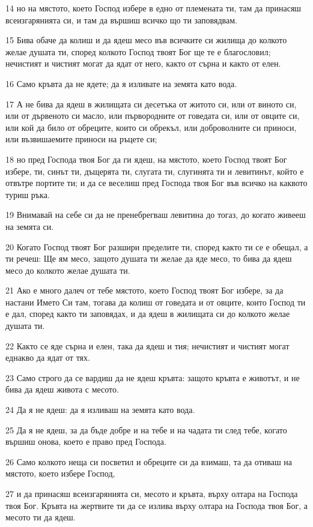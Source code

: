 \par 14 но на мястото, което Господ избере в едно от племената ти, там да принасяш всеизгарянията си, и там да вършиш всичко що ти заповядвам.
\par 15 Бива обаче да колиш и да ядеш месо във всичките си жилища до колкото желае душата ти, според колкото Господ твоят Бог ще те е благословил; нечистият и чистият могат да ядат от него, както от сърна и както от елен.
\par 16 Само кръвта да не ядете; да я изливате на земята като вода.
\par 17 А не бива да ядеш в жилищата си десетъка от житото си, или от виното си, или от дървеното си масло, или първородните от говедата си, или от овците си, или кой да било от обреците, които си обрекъл, или доброволните си приноси, или възвишаемите приноси на ръцете си;
\par 18 но пред Господа твоя Бог да ги ядеш, на мястото, което Господ твоят Бог избере, ти, синът ти, дъщерята ти, слугата ти, слугинята ти и левитинът, който е отвътре портите ти; и да се веселиш пред Господа твоя Бог във всичко на каквото туриш ръка.
\par 19 Внимавай на себе си да не пренебрегваш левитина до тогаз, до когато живееш на земята си.
\par 20 Когато Господ твоят Бог разшири пределите ти, според както ти се е обещал, а ти речеш: Ще ям месо, защото душата ти желае да яде месо, то бива да ядеш месо до колкото желае душата ти.
\par 21 Ако е много далеч от тебе мястото, което Господ твоят Бог избере, за да настани Името Си там, тогава да колиш от говедата и от овците, които Господ ти е дал, според както ти заповядах, и да ядеш в жилищата си до колкото желае душата ти.
\par 22 Както се яде сърна и елен, така да ядеш и тия; нечистият и чистият могат еднакво да ядат от тях.
\par 23 Само строго да се вардиш да не ядеш кръвта: защото кръвта е животът, и не бива да ядеш живота с месото.
\par 24 Да я не ядеш: да я изливаш на земята като вода.
\par 25 Да я не ядеш, за да бъде добре и на тебе и на чадата ти след тебе, когато вършиш онова, което е право пред Господа.
\par 26 Само колкото неща си посветил и обреците си да взимаш, та да отиваш на мястото, което избере Господ,
\par 27 и да принасяш всеизгарянията си, месото и кръвта, върху олтара на Господа твоя Бог. Кръвта на жертвите ти да се излива върху олтара на Господа твоя Бог, а месото ти да ядеш.

